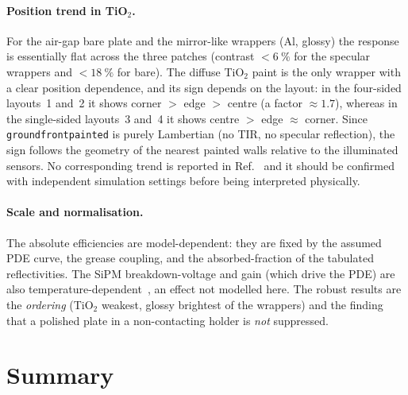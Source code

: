 \documentclass[11pt,a4paper]{article}
\begin{document}
\paragraph{Position trend in TiO$_2$.}
For the air-gap bare plate and the mirror-like wrappers (Al, glossy) the
response is essentially flat across the three patches (contrast
$<\!\SI{6}{\percent}$ for the specular wrappers and
$<\!\SI{18}{\percent}$ for bare). The diffuse TiO$_2$ paint is the only wrapper
with a clear position dependence, and its sign depends on the layout: in the
four-sided layouts~1 and~2 it shows corner $>$ edge $>$ centre (a factor
$\approx\!\num{1.7}$), whereas in the single-sided layouts~3 and~4 it shows
centre $>$ edge $\approx$ corner. Since \texttt{groundfrontpainted} is purely
Lambertian (no TIR, no specular reflection), the sign follows the geometry of
the nearest painted walls relative to the illuminated sensors. No corresponding
trend is reported in Ref.~\cite{Rao2025} and it should be confirmed with
independent simulation settings before being interpreted physically.

\paragraph{Scale and normalisation.}
The absolute efficiencies are model-dependent: they are fixed by the assumed
PDE curve, the grease coupling, and the absorbed-fraction of the tabulated
reflectivities. The SiPM breakdown-voltage and gain (which drive the PDE) are
also temperature-dependent~\cite{Anfimov2021}, an effect not modelled here. The
robust results are the \emph{ordering} (TiO$_2$ weakest, glossy brightest of the
wrappers) and the finding that a polished plate in a non-contacting holder is
\emph{not} suppressed.

\section{Summary}
\label{sec:summary}
\end{document}
